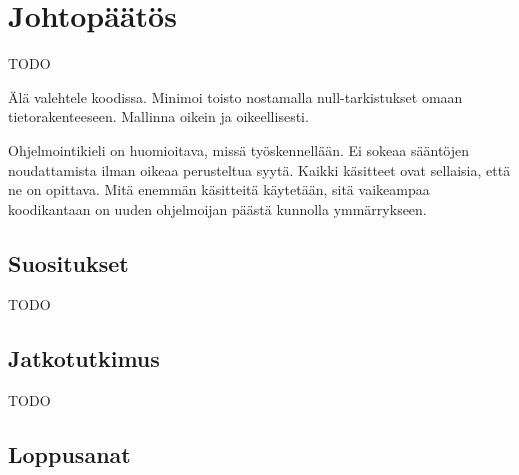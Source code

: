 \vspace{21.5pt}
\chapter{Johtopäätös}
TODO

Älä valehtele koodissa. Minimoi toisto nostamalla null-tarkistukset omaan tietorakenteeseen.
Mallinna oikein ja oikeellisesti.

Ohjelmointikieli on huomioitava, missä työskennellään. Ei sokeaa sääntöjen noudattamista ilman oikeaa perusteltua syytä. Kaikki käsitteet ovat sellaisia, että ne on opittava. Mitä enemmän käsitteitä käytetään, sitä vaikeampaa koodikantaan on uuden ohjelmoijan päästä kunnolla ymmärrykseen.

\section{Suositukset}

TODO


\section{Jatkotutkimus}

TODO

\section{Loppusanat}


